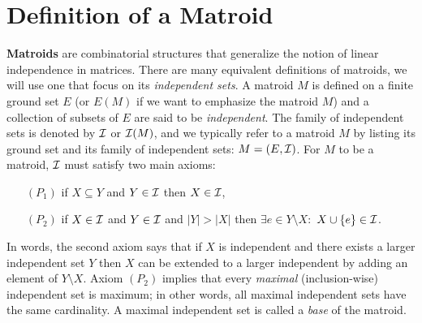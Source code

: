 \documentclass[12pt]{article}
\begin{document}

\section{Definition of a Matroid}
{\bf Matroids} are combinatorial structures that generalize the notion
of linear independence in matrices. There are many equivalent
definitions of matroids, we will use one that focus on its {\it
independent sets}. A matroid $M$ is defined on a finite ground set $E$
(or $E(M)$ if we want to emphasize the matroid $M$) and a collection
of subsets of $E$ are said to be {\it independent}. The family of
independent sets is denoted by ${\cal I}$ or ${\cal I}(M)$, and we
typically refer to a matroid $M$ by listing its ground set and its
family of independent sets: $M=(E,{\cal I})$. For $M$ to be a matroid,
${\cal I}$ must satisfy two main axioms:
\begin{enumerate}
\item[$(P_1)$] if $X\subseteq Y$ and $Y\in {\cal I}$ then $X\in {\cal
  I}$,
\item[$(P_2)$] if $X\in {\cal I}$ and $Y \in {\cal I}$ and $|Y|>|X|$
  then $\exists e\in Y\setminus X:$ $X\cup\{e\}\in {\cal I}$.
\end{enumerate}
In words, the second axiom says that if $X$ is independent and there
exists a larger independent set $Y$ then $X$ can be extended to a larger
independent by adding an element of $Y\setminus X$. Axiom $(P_2)$
implies that every {\it maximal} (inclusion-wise) independent set is
maximum; in other words, all  maximal independent sets have the same
cardinality. A maximal independent set is called a {\it base} of the matroid. 
  
\end{document}
